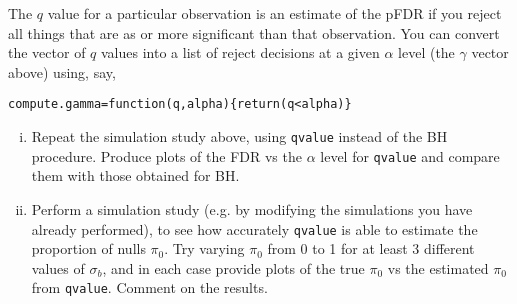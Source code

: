 \documentclass[12pt]{article}
\begin{document}
\begin{enumerate}
The $q$ value for a particular observation is an estimate of the pFDR 
if you reject all things that are as or more significant than that observation.
You can convert the vector of $q$ values into a list of reject decisions at a given $\alpha$ level (the $\gamma$ vector above) 
using, say,
\begin{verbatim}
compute.gamma=function(q,alpha){return(q<alpha)}
\end{verbatim}

\begin{enumerate}[i)]
\item Repeat the simulation study above, using {\tt qvalue} instead of the BH procedure. Produce plots of the FDR vs the $\alpha$
level for {\tt qvalue} and compare them with those obtained for BH.
\item Perform a simulation study (e.g. by modifying the simulations you have already performed), to see how accurately {\tt qvalue} is able to estimate the
proportion of nulls $\pi_0$. Try varying  $\pi_0$ from 0 to 1 for at least 3 different values of $\sigma_b$, and in each case provide plots of the true $\pi_0$ vs
the estimated $\pi_0$ from {\tt qvalue}. Comment on the results.
\end{enumerate}




\end{enumerate}
\end{document}
